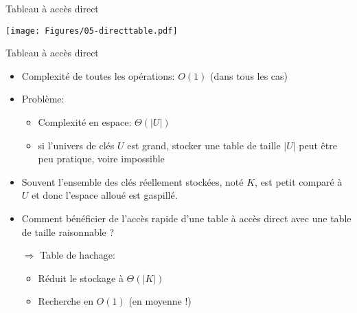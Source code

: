 \begin{frame}{Tableau à accès direct}

\centerline{\texttt{[image: Figures/05-directtable.pdf]}}

\begin{center}
\begin{small}


\end{small}
\end{center}


\end{frame}

\begin{frame}{Tableau à accès direct}

\begin{itemize}
\item Complexité de toutes les opérations: $O(1)$ (dans tous les cas)
\item Problème:
\begin{itemize}
\item Complexité en espace: $\Theta(|U|)$
\item si l'univers de clés $U$ est grand, stocker une table de taille $|U|$ peut être peu pratique, voire impossible
\end{itemize}
\item Souvent l'ensemble des clés réellement stockées, noté $K$, est petit comparé à $U$ et donc l'espace alloué est gaspillé.

\bigskip\bigskip

\item Comment bénéficier de l'accès rapide d'une table à accès direct avec une table de taille raisonnable ?\\

\medskip

$\Rightarrow$ \alert{Table de hachage:}
\begin{itemize}
\item Réduit le stockage à $\Theta(|K|)$
\item Recherche en $O(1)$ (\alert{en moyenne} !)
\end{itemize}
\end{itemize}
\end{frame}

